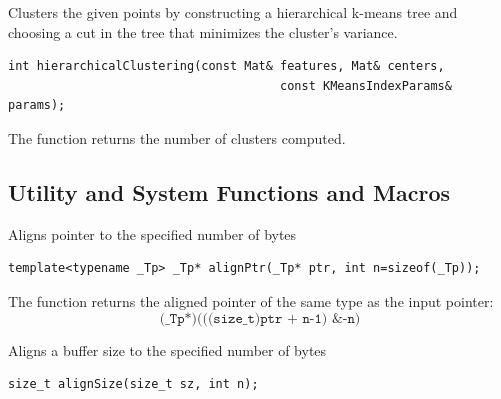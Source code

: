 \label{flann::hierarchicalClustering}
Clusters the given points by constructing a hierarchical k-means tree and choosing a cut in the tree that minimizes the cluster's variance.
\begin{lstlisting}
int hierarchicalClustering(const Mat& features, Mat& centers,
                                      const KMeansIndexParams& params);
\end{lstlisting}
\begin{description}
\end{description}
The function returns the number of clusters computed.



\subsection{Utility and System Functions and Macros}

\label{alignPtr}
Aligns pointer to the specified number of bytes

\begin{lstlisting}
template<typename _Tp> _Tp* alignPtr(_Tp* ptr, int n=sizeof(_Tp));
\end{lstlisting}
\begin{description}
\end{description}

The function returns the aligned pointer of the same type as the input pointer:
\[\texttt{(\_Tp*)(((size\_t)ptr + n-1) \& -n)}\]


\label{alignSize}
Aligns a buffer size to the specified number of bytes

\begin{lstlisting}
size_t alignSize(size_t sz, int n);
\end{lstlisting}
\begin{description}
\end{description}

